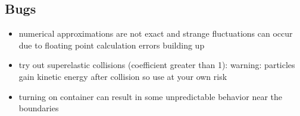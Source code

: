 \documentclass{article}
\begin{document}
\subsection*{Bugs}

\begin{itemize}
	\item numerical approximations are not exact and strange fluctuations can occur due to floating point calculation errors building up
	\item try out superelastic collisions (coefficient greater than 1): warning: particles gain kinetic energy after collision so use at your own risk
	\item turning on container can result in some unpredictable behavior near the boundaries
\end{itemize}
\end{document}
